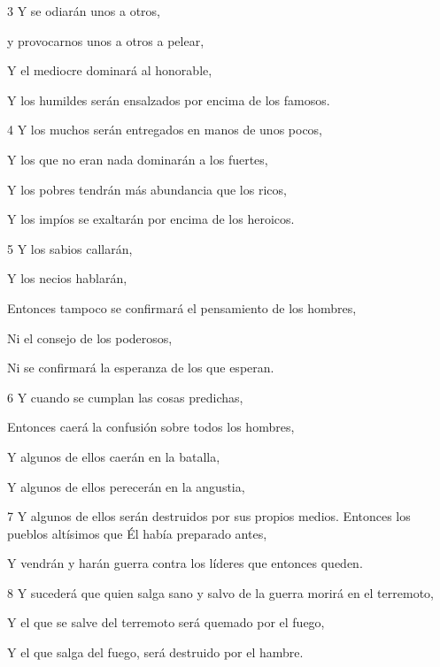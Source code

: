 \par 3 Y se odiarán unos a otros,

\par y provocarnos unos a otros a pelear,

\par Y el mediocre dominará al honorable,

\par Y los humildes serán ensalzados por encima de los famosos.

\par 4 Y los muchos serán entregados en manos de unos pocos,

Y los que no eran nada dominarán a los fuertes,

Y los pobres tendrán más abundancia que los ricos,

\par Y los impíos se exaltarán por encima de los heroicos.

\par 5 Y los sabios callarán,

\par Y los necios hablarán,

Entonces tampoco se confirmará el pensamiento de los hombres,

Ni el consejo de los poderosos,

\par Ni se confirmará la esperanza de los que esperan.

\par 6 Y cuando se cumplan las cosas predichas,

Entonces caerá la confusión sobre todos los hombres,

\par Y algunos de ellos caerán en la batalla,

Y algunos de ellos perecerán en la angustia,

\par 7 Y algunos de ellos serán destruidos por sus propios medios. Entonces los pueblos altísimos que Él había preparado antes,

Y vendrán y harán guerra contra los líderes que entonces queden.

\par 8 Y sucederá que quien salga sano y salvo de la guerra morirá en el terremoto,

Y el que se salve del terremoto será quemado por el fuego,

Y el que salga del fuego, será destruido por el hambre.

